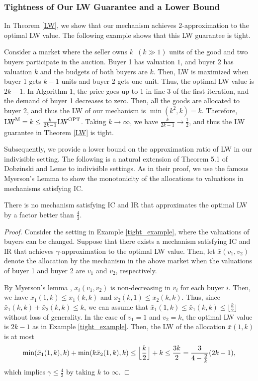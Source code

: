 \documentclass[letterpaper,11pt]{article}
\begin{document}
\subsubsection{Tightness of Our LW Guarantee and a Lower Bound}
	In Theorem \ref{LW}, we show that our mechanism achieves 2-approximation to the optimal LW value.
	The following example shows that this LW guarantee is tight.
	\begin{example}
	\label{tight_example}
	Consider a market where 
	the seller owns $k$\ $(k\gg 1)$ units of the good and 
	two buyers participate in the auction.
	Buyer 1 has valuation $1$, and buyer 2 has valuation $k$ 
	and the budgets of both buyers are $k$.
	Then, LW is maximized when buyer 1 gets $k-1$ units and buyer 2 gets one unit.
	Thus, the optimal LW value is $2k-1$.
	In Algorithm 1, the price goes up to 1 in line 3 of the first iteration, 
	and the demand of buyer 1 decreases to zero.
	Then, all the goods are allocated to buyer 2, and 
	thus the LW of our mechanism is $\min(k^2, k)=k$.
	Therefore, 
	${\rm LW}^{\rm M}=k\leq \frac{k}{2k-1}{\rm LW}^{\rm OPT}$.
	Taking $k\to\infty$, we have $\frac{k}{2k-1}\to \frac{1}{2}$, 
	and thus the LW guarantee in Theorem \ref{LW} is tight.
	\end{example}

	Subsequently, we provide a lower bound on the approximation ratio of LW in our indivisible setting. 
	The following is a natural extension 
	of Theorem 5.1 of Dobzinski and Leme \cite{DL2014} to indivisible settings. 
	As in their proof, we use the famous Myerson's Lemma \cite{M1981} to 
	show the monotonicity of the allocations to valuations in mechanisms satisfying IC. 
	\begin{proposition}
	\label{lower_bound}
	There is no mechanism satisfying IC and IR that 
	approximates the optimal LW by a factor better than $\frac{4}{3}$.
	\end{proposition}
	\begin{proof}
	Consider the setting in Example \ref{tight_example}, where the valuations of buyers can be changed.
	Suppose that there exists a mechanism satisfying IC and IR that achieves 
	$\gamma$-approximation to the optimal LW value. 
	Then, let $\bar{x}(v_1,v_2)$ denote the allocation by the mechanism in the above market when 
	the valuations of buyer 1 and buyer 2 are $v_1$ and $v_2$, respectively.
	
	By Myerson's lemma \cite{M1981}, $\bar{x}_i(v_1,v_2)$ is non-decreasing in $v_i$ for each buyer $i$.
	Then, we have
	 $\bar{x}_1(1, k)\leq \bar{x}_1(k, k)$ and  $\bar{x}_2(k, 1)\leq \bar{x}_2(k, k)$.
	 Thus, since $\bar{x}_1(k, k)+\bar{x}_2(k, k)\leq k$, we can assume that 
	 $\bar{x}_1(1, k)\leq \bar{x}_1(k, k)\leq \lfloor \frac{k}{2}\rfloor$ without loss of generality.
	In the case of $v_1=1$ and $v_2=k$, the optimal LW value is $2k-1$ as in Example \ref{tight_example}.
	 Then, the LW of the allocation $\bar{x}(1, k)$ is at most 
	 \[
	\min( \bar{x}_1(1, k), k)+\min( k \bar{x}_2(1, k), k)\leq \Bigl\lfloor \frac{k}{2}\Bigr\rfloor + k \leq 
	\frac{3k}{2}=\frac{3}{4-\frac{2}{k}}(2k-1),
	 \]
	 which implies $\gamma\leq \frac{4}{3}$ by taking $k$ to $\infty$.
	\end{proof}
\end{document}
